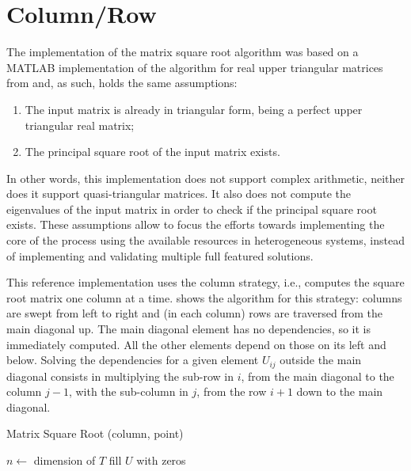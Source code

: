 \documentclass[../thesis]{subfiles}
\begin{document}
	\section{Column/Row}
	\label{sec:multicore:column}
	The implementation of the matrix square root algorithm was based on a MATLAB implementation of the algorithm for real upper triangular matrices from \cite{Deadman:Higham:Ralha:2013} and, as such, holds the same assumptions:
		\begin{enumerate}
			\item The input matrix is already in triangular form, being a perfect upper triangular real matrix;
			\item The principal square root of the input matrix exists.
		\end{enumerate}
	In other words, this implementation does not support complex arithmetic, neither does it support quasi-triangular matrices. It also does not compute the eigenvalues of the input matrix in order to check if the principal square root exists. These assumptions allow to focus the efforts towards implementing the core of the process using the available resources in heterogeneous systems, instead of implementing and validating multiple full featured solutions.

	This reference implementation uses the column strategy, i.e., computes the square root matrix one column at a time.  shows the algorithm for this strategy: columns are swept from left to right and (in each column) rows are traversed from the main diagonal up. The main diagonal element has no dependencies, so it is immediately computed. All the other elements depend on those on its left and below. Solving the dependencies for a given element $U_{ij}$ outside the main diagonal consists in multiplying the sub-row in $i$, from the main diagonal to the column $j-1$, with the sub-column in $j$, from the row $i+1$ down to the main diagonal.

	\begin{algorithm}[!t]
		\caption{Matrix Square Root (column, point)}
		\label{alg:sqrtm:column:point}
		\DontPrintSemicolon


		$n \leftarrow$ dimension of $T$\;
		fill $U$ with zeros\;

	\end{algorithm}
\end{document}
